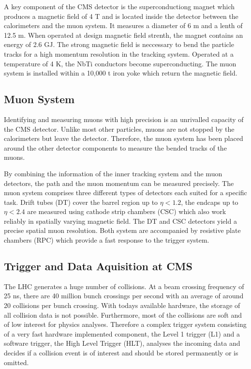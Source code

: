 A key component of the CMS detector is the superconductiong magnet which
produces a magnetic field of 4 T and is located inside the detector between the
calorimeters and the muon system. It measures a diameter of 6 m and a lenth of
12.5 m. When operated at design magnetic field strenth, the magnet contains an
energy of 2.6 GJ. The strong magnetic field is neccessary to bend the particle
tracks for a high momentum resolution in the tracking system. Operated at a
temperature of 4 K, the NbTi conductors become superconducting. The muon system
is installed within a 10,000 t iron yoke which return the magnetic field.

\subsection{Muon System}

Identifying and measuring muons with high precision is an unrivalled capacity of
the CMS detector. Unlike most other particles, muons are not stopped by the
calorimeters but leave the detector. Therefore, the muon system has been placed
around the other detector components to measure the bended tracks of the muons.

By combining the information of the inner tracking system and the muon
detectors, the path and the muon momentum can be measured precisely. The muon
system comprises three different types of detectors each suited for a specific
task. Drift tubes (DT) cover the barrel region up to $\eta < 1.2$, the endcaps
up to $\eta < 2.4$ are measured using cathode strip chambers (CSC) which also
work reliably in spatially varying magnetic field. The DT and CSC detectors
yield a precise spatial muon resolution. Both system are accompanied by
resistive plate chambers (RPC) which provide a fast response to the trigger
system.

\subsection{Trigger and Data Aquisition at CMS}

The LHC generates a huge number of collisions. At a beam crossing frequency of
25 ns, there are 40 million bunch crossings per second with an average of around
20 collisions per bunch crossing. With todays available hardware, the storage of
all collision data is not possible. Furthermore, most of the collisions are soft
and of low interest for physics analyses. Therefore a complex trigger system
consisting of a very fast hardware implemented component, the Level 1 trigger
(L1) and a software trigger, the High Level Trigger (HLT), analyses the incoming
data and decides if a collision event is of interest and should be stored
permanently or is omitted.

